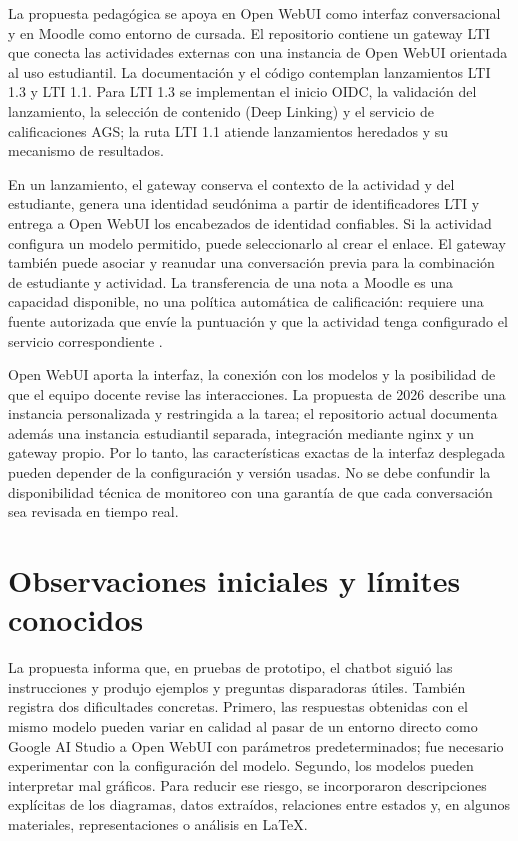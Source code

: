 \documentclass[11pt,a4paper]{article}
\begin{document}
La propuesta pedagógica se apoya en Open WebUI como interfaz conversacional y en Moodle como entorno de cursada. El repositorio contiene un gateway LTI que conecta las actividades externas con una instancia de Open WebUI orientada al uso estudiantil. La documentación y el código contemplan lanzamientos LTI 1.3 y LTI 1.1. Para LTI 1.3 se implementan el inicio OIDC, la validación del lanzamiento, la selección de contenido (Deep Linking) y el servicio de calificaciones AGS; la ruta LTI 1.1 atiende lanzamientos heredados y su mecanismo de resultados.

En un lanzamiento, el gateway conserva el contexto de la actividad y del estudiante, genera una identidad seudónima a partir de identificadores LTI y entrega a Open WebUI los encabezados de identidad confiables. Si la actividad configura un modelo permitido, puede seleccionarlo al crear el enlace. El gateway también puede asociar y reanudar una conversación previa para la combinación de estudiante y actividad. La transferencia de una nota a Moodle es una capacidad disponible, no una política automática de calificación: requiere una fuente autorizada que envíe la puntuación y que la actividad tenga configurado el servicio correspondiente \cite{repo}.

Open WebUI aporta la interfaz, la conexión con los modelos y la posibilidad de que el equipo docente revise las interacciones. La propuesta de 2026 describe una instancia personalizada y restringida a la tarea; el repositorio actual documenta además una instancia estudiantil separada, integración mediante nginx y un gateway propio. Por lo tanto, las características exactas de la interfaz desplegada pueden depender de la configuración y versión usadas. No se debe confundir la disponibilidad técnica de monitoreo con una garantía de que cada conversación sea revisada en tiempo real.

\section{Observaciones iniciales y límites conocidos}

La propuesta informa que, en pruebas de prototipo, el chatbot siguió las instrucciones y produjo ejemplos y preguntas disparadoras útiles. También registra dos dificultades concretas. Primero, las respuestas obtenidas con el mismo modelo pueden variar en calidad al pasar de un entorno directo como Google AI Studio a Open WebUI con parámetros predeterminados; fue necesario experimentar con la configuración del modelo. Segundo, los modelos pueden interpretar mal gráficos. Para reducir ese riesgo, se incorporaron descripciones explícitas de los diagramas, datos extraídos, relaciones entre estados y, en algunos materiales, representaciones o análisis en \LaTeX.
\end{document}
